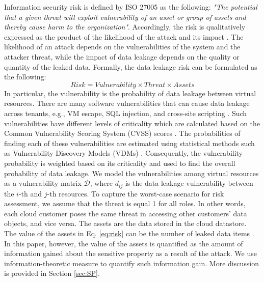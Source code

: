 Information security risk is defined by ISO 27005 as the following: \textit{"The potential that a given threat will exploit vulnerability of an asset or group of assets and thereby cause harm to the organization"}. Accordingly, the risk is qualitatively expressed as the product of the likelihood of the attack and its impact \cite{djemame2016risk}. The likelihood of an attack depends on the vulnerabilities of the system and the attacker threat, while the impact of data leakage depends on the quality or quantity of the leaked data. Formally, the data leakage risk can be formulated as the following:
\begin{equation}
Risk = Vulnerability \times Threat \times Assets 
\label{eq:risk}
\end{equation}
In particular, the vulnerability is the probability of data leakage between virtual resources. There are many software vulnerabilities that can cause data leakage across tenants, e.g., VM escape, SQL injection, and cross-site scripting \cite{pearce2013virtualization}. Such vulnerabilities have different levels of criticality which are calculated based on the Common Vulnerability Scoring System (CVSS) scores \cite{grobauer2011understanding}. The probabilities of finding each of these vulnerabilities are estimated using statistical methods such as Vulnerability Discovery Models (VDMs) \cite{ristenpart2009hey}. Consequently, the vulnerability probability is weighted based on its criticality and used to find the overall probability of data leakage. We model the vulnerabilities among virtual resources as a vulnerability matrix $\mathcal{D}$, where $d_{ij}$ is the data leakage vulnerability between the $i$-th and $j$-th resources. To capture the worst-case scenario for risk assessment, we assume that the threat is equal 1 for all roles. In other words, each cloud customer poses the same threat in accessing other customers' data objects, and vice versa. The assets are the data stored in the cloud datastore. The value of the assets in Eq. \ref{eq:risk} can be the number of leaked data items \cite{almutairi2015risk}. In this paper, however, the value of the assets is quantified as the amount of information gained about the sensitive property as a result of the attack. We use information-theoretic measure to quantify such information gain. More discussion is provided in Section \ref{sec:SP}.



